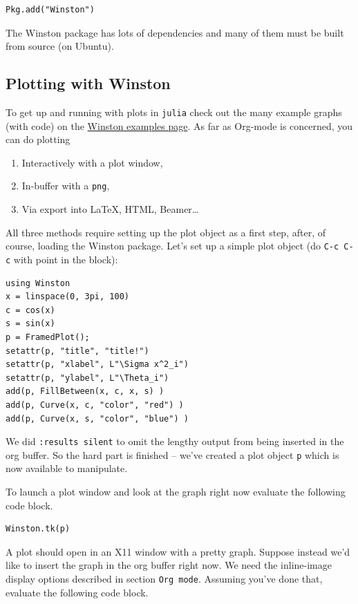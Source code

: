 \documentclass[11pt]{article}
\begin{document}
\begin{verbatim}
Pkg.add("Winston")
\end{verbatim}

The Winston package has lots of dependencies and many of them must be
built from source (on Ubuntu).

\subsection[Plotting with Winston]{Plotting with Winston}
\label{sec-3-1}

To get up and running with plots in \texttt{julia} check out the many example
graphs (with code) on the \href{https://github.com/nolta/Winston.jl/blob/master/doc/examples.md}{Winston examples page}. As far as Org-mode is
concerned, you can do plotting

\begin{enumerate}
\item Interactively with a plot window,
\item In-buffer with a \texttt{png},
\item Via export into \LaTeX{}, HTML, Beamer\ldots{}
\end{enumerate}

All three methods require setting up the plot object as a first step,
after, of course, loading the Winston package.  Let's set up a simple
plot object (do \texttt{C-c C-c} with point in the block):

\begin{verbatim}
using Winston
x = linspace(0, 3pi, 100)
c = cos(x)
s = sin(x)
p = FramedPlot();
setattr(p, "title", "title!")
setattr(p, "xlabel", L"\Sigma x^2_i")
setattr(p, "ylabel", L"\Theta_i")
add(p, FillBetween(x, c, x, s) )
add(p, Curve(x, c, "color", "red") )
add(p, Curve(x, s, "color", "blue") )
\end{verbatim}

We did \texttt{:results silent} to omit the lengthy output from being
inserted in the org buffer. So the hard part is finished -- we've
created a plot object \texttt{p} which is now available to manipulate.

To launch a plot window and look at the graph right now evaluate the
following code block.

\begin{verbatim}
Winston.tk(p)
\end{verbatim}

A plot should open in an X11 window with a pretty graph. Suppose
instead we'd like to insert the graph in the org buffer right now. We
need the inline-image display options described in section \texttt{Org
mode}. Assuming you've done that, evaluate the following code block.
\end{document}
